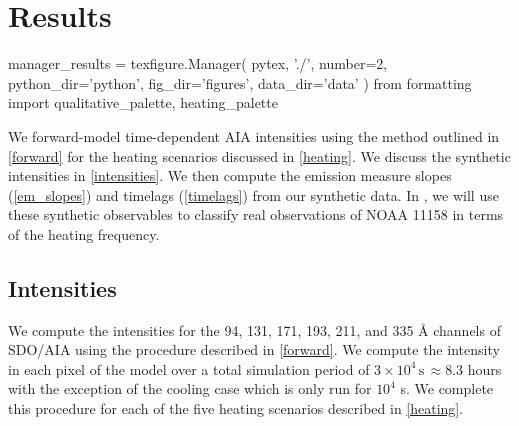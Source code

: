 \section{Results}\label{results}

\begin{pycode}
manager_results = texfigure.Manager(
    pytex,
    './',
    number=2,
    python_dir='python',
    fig_dir='figures',
    data_dir='data'
)
from formatting import qualitative_palette, heating_palette
\end{pycode}

We forward-model time-dependent AIA intensities using the method outlined in \autoref{forward} for the heating scenarios discussed in \autoref{heating}. We discuss the synthetic intensities in \autoref{intensities}. We then compute the emission measure slopes (\autoref{em_slopes}) and timelags (\autoref{timelags}) from our synthetic data. In , we will use these synthetic observables to classify real observations of NOAA 11158 in terms of the heating frequency.

\subsection{Intensities}\label{intensities}

We compute the intensities for the 94, 131, 171, 193, 211, and 335 \AA{} channels of SDO/AIA using the procedure described in \autoref{forward}. We compute the intensity in each pixel of the model \AR{} over a total simulation period of $3\times10^4\,\mathrm{s}\,\approx8.3$ hours with the exception of the cooling case which is only run for $10^4$ s. We complete this procedure for each of the five heating scenarios described in \autoref{heating}.

